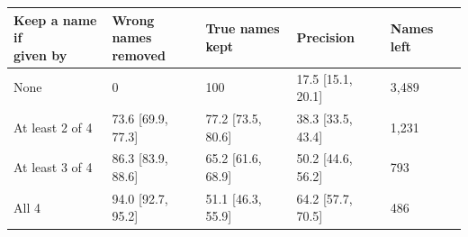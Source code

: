 \begin{tabular}{@{}lllll@{}}
\toprule
\shortstack[l]{Keep a name if\\given by} & \shortstack[l]{Wrong names\\removed} & \shortstack[l]{True names\\kept} & Precision & Names left \\
\midrule
None & 0 & 100 & 17.5 {\scriptsize[15.1, 20.1]} & 3{,}489 \\
At least 2 of 4 & 73.6 {\scriptsize[69.9, 77.3]} & 77.2 {\scriptsize[73.5, 80.6]} & 38.3 {\scriptsize[33.5, 43.4]} & 1{,}231 \\
At least 3 of 4 & 86.3 {\scriptsize[83.9, 88.6]} & 65.2 {\scriptsize[61.6, 68.9]} & 50.2 {\scriptsize[44.6, 56.2]} & 793 \\
All 4 & 94.0 {\scriptsize[92.7, 95.2]} & 51.1 {\scriptsize[46.3, 55.9]} & 64.2 {\scriptsize[57.7, 70.5]} & 486 \\
\bottomrule
\end{tabular}
